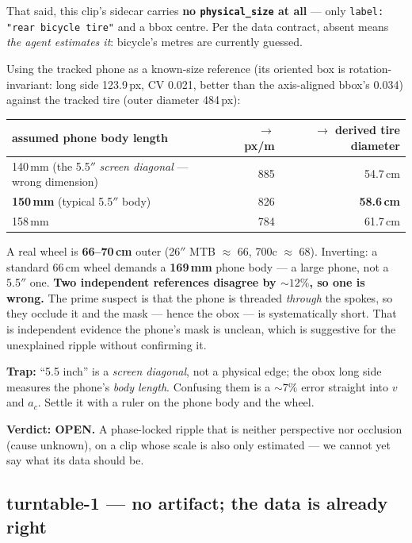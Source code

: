 \documentclass[11pt,a4paper]{article}
\begin{document}
That said, this clip's sidecar carries \textbf{no \texttt{physical\_size} at all} --- only
\texttt{label: "rear bicycle tire"} and a bbox centre. Per the data contract, absent means
\emph{the agent estimates it}: bicycle's metres are currently guessed.

Using the tracked phone as a known-size reference (its oriented box is rotation-invariant: long
side 123.9\,px, CV 0.021, better than the axis-aligned bbox's 0.034) against the tracked tire
(outer diameter 484\,px):

\begin{center}
\begin{tabular}{lrr}
\toprule
assumed phone body length & $\rightarrow$ px/m & $\rightarrow$ derived tire diameter \\
\midrule
140\,mm (the 5.5$''$ \emph{screen diagonal} --- wrong dimension) & 885 & 54.7\,cm \\
\textbf{150\,mm} (typical 5.5$''$ body) & 826 & \textbf{58.6\,cm} \\
158\,mm & 784 & 61.7\,cm \\
\bottomrule
\end{tabular}
\end{center}

A real wheel is \textbf{66--70\,cm} outer (26$''$ MTB $\approx$ 66, 700c $\approx$ 68). Inverting:
a standard 66\,cm wheel demands a \textbf{169\,mm} phone body --- a large phone, not a 5.5$''$ one.
\textbf{Two independent references disagree by ${\sim}12\%$, so one is wrong.} The prime suspect is
that the phone is threaded \emph{through} the spokes, so they occlude it and the mask --- hence the
obox --- is systematically short. That is independent evidence the phone's mask is unclean, which
is suggestive for the unexplained ripple without confirming it.

\textbf{Trap:} ``5.5 inch'' is a \emph{screen diagonal}, not a physical edge; the obox long side
measures the phone's \emph{body length}. Confusing them is a ${\sim}7\%$ error straight into $v$
and $a_c$. Settle it with a ruler on the phone body and the wheel.

\textbf{Verdict: OPEN.} A phase-locked ripple that is neither perspective nor occlusion (cause
unknown), on a clip whose scale is also only estimated --- we cannot yet say what its data should be.

\subsection{turntable-1 --- no artifact; the data is already right}
\end{document}
